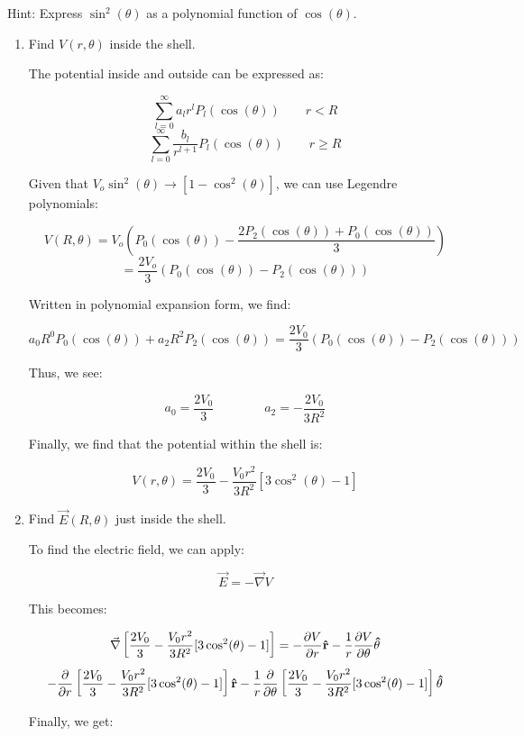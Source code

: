 \begin{enumerate}
    Hint: Express $\sin^2(\theta)$ as a polynomial function of $\cos(\theta)$.

    \begin{enumerate}

      \item Find $V(r, \theta)$ inside the shell.

        The potential inside and outside can be expressed as:

        $$\sum_{l=0}^\infty a_lr^lP_l(\cos(\theta))\quad\quad r<R$$
        $$\sum_{l=0}^\infty \frac{b_l}{r^{l+1}}P_l(\cos(\theta))\quad\quad r\geq R$$

        Given that $V_o\sin^2(\theta)\to[1-\cos^2(\theta)]$, we can use Legendre polynomials:

        $$V(R,\theta)=V_o\left(P_0(\cos(\theta))-\frac{2P_2(\cos(\theta))+P_0(\cos(\theta))}{3}\right)$$
        $$=\frac{2V_o}{3}\left(P_0(\cos(\theta))-P_2(\cos(\theta))\right)$$

        Written in polynomial expansion form, we find:

        $$a_0R^0P_0(\cos(\theta))+a_2R^2P_2(\cos(\theta))=\frac{2V_0}{3}\left(P_0(\cos(\theta))-P_2(\cos(\theta))\right)$$

        Thus, we see:

        $$a_0=\frac{2V_0}{3}\quad\quad\quad\quad a_2=-\frac{2V_0}{3R^2}$$

        Finally, we find that the potential within the shell is:

        $$\boxed{V(r,\theta)=\frac{2V_0}{3}-\frac{V_0r^2}{3R^2}[3\cos^2(\theta)-1]}$$

      \item Find $\vec{E}(R,\theta)$ just inside the shell.

        To find the electric field, we can apply:

        $$\vec{E}=-\vec{\nabla}V$$

        This becomes:

        $$\vec{\nabla}\left[ \frac{2V_0}{3}-\frac{V_0r^2}{3R^2}[3\cos^2(\theta)-1] \right]=-\frac{\partial V}{\partial r}\bold{\hat{r}}-\frac{1}{r}\frac{\partial V}{\partial \theta}\bold{\hat{\theta}}$$
        $$-\frac{\partial}{\partial r}\left[ \frac{2V_0}{3}-\frac{V_0r^2}{3R^2}[3\cos^2(\theta)-1] \right]\bold{\hat{r}}-\frac{1}{r}\frac{\partial}{\partial \theta}\left[ \frac{2V_0}{3}-\frac{V_0r^2}{3R^2}[3\cos^2(\theta)-1] \right]\bold{\hat{\theta}}$$

        Finally, we get:


\end{enumerate}
\end{enumerate}

